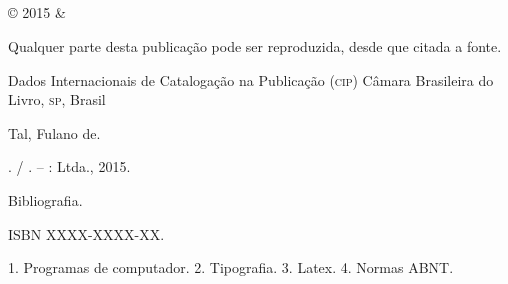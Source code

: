 \documentclass[
	10pt,				%
	openright,			%
	twoside,			%
	a5paper,			%
	english,			%
	french,				%
	spanish,			%
	brazil,				%
	sumario=tradicional
]{abntex2}
\begin{document}
\frenchspacing

\frontmatter

\begin{titlingpage}
\phantom{xxx}
\vspace{0.5cm}
\huge
\raggedright
\imprimirautor\\
\vspace{2.5cm}
\huge 
{\raggedleft
\textit{\textcolor{blue}{\imprimirtitulo}}\\[1cm]
}
\centering 
\vfill
\Large
\imprimirinstituicao
\end{titlingpage}

\begin{titlingpage}

\phantom{xxx}
\vspace{0.5cm}
\huge
\raggedright
\imprimirautor\\
\vspace{2.5cm}
\huge 
{\raggedleft
\textit{\textcolor{blue}{\imprimirtitulo}}\\[1cm]
}
\centering 
\vfill
\Large
\imprimirinstituicao

\clearpage
\ABNTEXfontereduzida
© 2015 \imprimirautor \space \& \imprimirinstituicao

Qualquer parte desta publicação pode ser reproduzida, desde que citada a fonte.

\vspace*{\fill}

\begin{center}
Dados Internacionais de Catalogação na Publicação (\textsc{cip})
Câmara Brasileira do Livro, \textsc{sp}, Brasil
\end{center}

\begin{mdframed}
\noindent Tal, Fulano de.

\imprimirtitulo. / \imprimirautor. -- \imprimirlocal: \imprimirinstituicao
Ltda., 2015.

\medskip

Bibliografia.

ISBN XXXX-XXXX-XX.

\medskip

1. Programas de computador. 2. Tipografia. 3. Latex. 4. Normas ABNT.

\end{mdframed}

\end{titlingpage}
\end{document}
